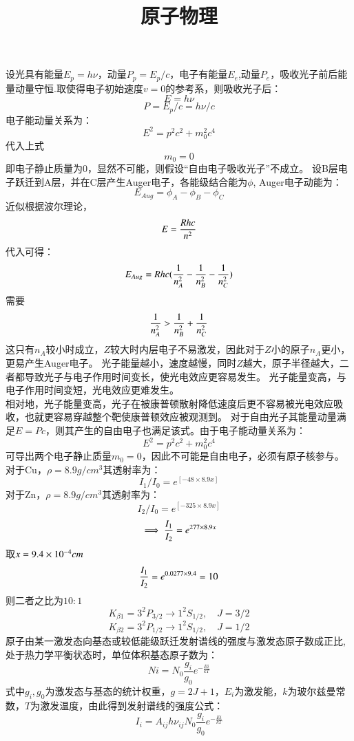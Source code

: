 \documentclass[UTF8,9pt]{ctexart}
\title{原子物理}
\begin{document}
 
\maketitle 
{}
设光具有能量$E_p=h\nu$，动量$P_p=E_p/c$，电子有能量$E_e$,动量$P_e$，吸收光子前后能量动量守恒.取使得电子初始速度$v=0$的参考系，则吸收光子后：
$$E=h\nu$$
$$P=E_p/c=h\nu/c$$
电子能动量关系为：
$$E^2=p^2c^2+m_0^2c^4$$
代入上式
$$m_0=0$$
即电子静止质量为0，显然不可能，则假设“自由电子吸收光子”不成立。
设B层电子跃迁到A层，并在C层产生Auger电子，各能级结合能为$\phi$, Auger电子动能为：
$$E_{Aug}=\phi_A-\phi_B-\phi_C$$
近似根据波尔理论，$$E=\frac{Rhc}{n^2}$$
代入可得：
$$E_{Aug}=Rhc(\frac{1}{n_A^2}-\frac{1}{n_B^2}-\frac{1}{n_C^2})$$
需要
$$\frac{1}{n_A^2}>\frac{1}{n_B^2}+\frac{1}{n_C^2}$$
这只有$n_A$较小时成立，$Z$较大时内层电子不易激发，因此对于$Z$小的原子$n_A$更小，更易产生Auger电子。
    光子能量越小，速度越慢，同时$Z$越大，原子半径越大，二者都导致光子与电子作用时间变长，使光电效应更容易发生。
    光子能量变高，与电子作用时间变短，光电效应更难发生。\\
    相对地，光子能量变高，光子在被康普顿散射降低速度后更不容易被光电效应吸收，也就更容易穿越整个靶使康普顿效应被观测到。
    对于自由光子其能量动量满足$E=Pc$，则其产生的自由电子也满足该式。由于电子能动量关系为：
    $$E^2=p^2c^2+m_0^2c^4$$
    可导出两个电子静止质量$m_0=0$，因此不可能是自由电子，必须有原子核参与。
对于Cu，$\rho=8.9g/cm^3$其透射率为：
$$I_1/I_0=e^{[-48 \times 8.9 x]}$$
对于Zn，$\rho=8.9g/cm^3$其透射率为：
$$I_2/I_0=e^{[-325 \times 8.9 x]}$$
$$\implies \frac{I_1}{I_2}=e^{277 \times 8.9 x}$$
取$x=9.4\times 10^{-4} cm$
$$\frac{I_1}{I_2}=e^{0.0277 \times 9.4}=10$$
则二者之比为$10:1$
$$K_{\beta1}={3}^2P_{3/2} \rightarrow {1}^2S_{1/2},\quad J=3/2$$
$$K_{\beta2}={3}^2P_{1/2} \rightarrow {1}^2S_{1/2},\quad J=1/2$$
原子由某一激发态向基态或较低能级跃迁发射谱线的强度与激发态原子数成正比,处于热力学平衡状态时，单位体积基态原子数为：
$$N i = N _ { 0 } \frac { g _ { i } } { g _ { 0 } } e ^ { - \frac { E i } { k T } }$$
式中$g_i, g_0$为激发态与基态的统计权重，$g=2J+1$，$E_i$为激发能，$k$为玻尔兹曼常数，$T$为激发温度，由此得到发射谱线的强度公式：
$$I _ { i } = A _ { i j } h \nu _ { i j } N _ { 0 } \frac { g _ { i } } { g _ { 0 } } e ^ { - \frac { E i } { k T } }$$
\end{document}
